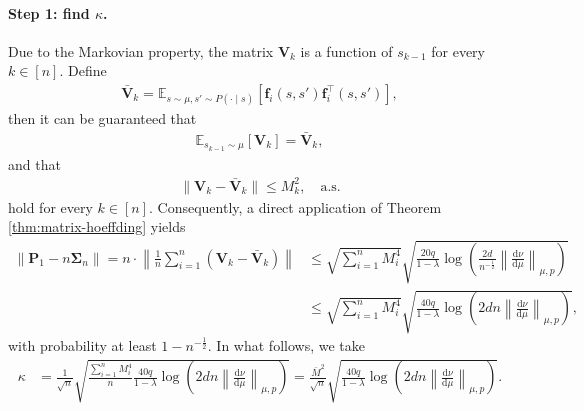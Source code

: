 \paragraph{Step 1: find $\kappa$.} Due to the Markovian property, the matrix $\bm{V}_k$ is a function of $s_{k-1}$ for every $k \in [n]$. Define
\begin{align*}
\bar{\bm{V}}_k = \mathbb{E}_{s \sim \mu,s' \sim P(\cdot \mid s)}[\bm{f}_i(s,s')\bm{f}_i^\top (s,s')],
\end{align*}
then it can be guaranteed that
\begin{align*}
\mathbb{E}_{s_{k-1}\sim \mu} [\bm{V}_k] = \bar{\bm{V}}_k, 
\end{align*}
and that
\begin{align*}
\|\bm{V}_k - \bar{\bm{V}}_k\| \leq M_k^2, \quad \text{a.s.}
\end{align*}
hold for every $k \in [n]$.
Consequently, a direct application of Theorem \ref{thm:matrix-hoeffding} yields
\begin{align*}
\|\bm{P}_1 - n\bm{\Sigma}_n\|= n \cdot \left\|\frac{1}{n}\sum_{i=1}^n (\bm{V}_k - \bar{\bm{V}}_k)\right\| &\leq \sqrt{\sum_{i=1}^n M_i^4} \sqrt{\frac{20q}{1-\lambda} \log \left(\frac{2d}{n^{-\frac{1}{2}}}\left\|\frac{\mathrm{d}\nu}{\mathrm{d}\mu}\right\|_{\mu,p}\right)} \\ 
 &\leq \sqrt{\sum_{i=1}^n M_i^4}\sqrt{\frac{40q}{1-\lambda} \log \left(2d n \left\|\frac{\mathrm{d}\nu}{\mathrm{d}\mu}\right\|_{\mu,p}\right)},
\end{align*}
with probability at least $1-n^{-\frac{1}{2}}$. In what follows, we take
\begin{align*}
\kappa &= \frac{1}{\sqrt{n}}\sqrt{\frac{\sum_{i=1}^n M_i^4 }{n} \frac{40q}{1-\lambda} \log \left(2d n \left\|\frac{\mathrm{d}\nu}{\mathrm{d}\mu}\right\|_{\mu,p}\right)} = \frac{\bar{M}^2}{\sqrt{n}} \sqrt{\frac{40q}{1-\lambda} \log \left(2d n \left\|\frac{\mathrm{d}\nu}{\mathrm{d}\mu}\right\|_{\mu,p}\right)}.
\end{align*}
